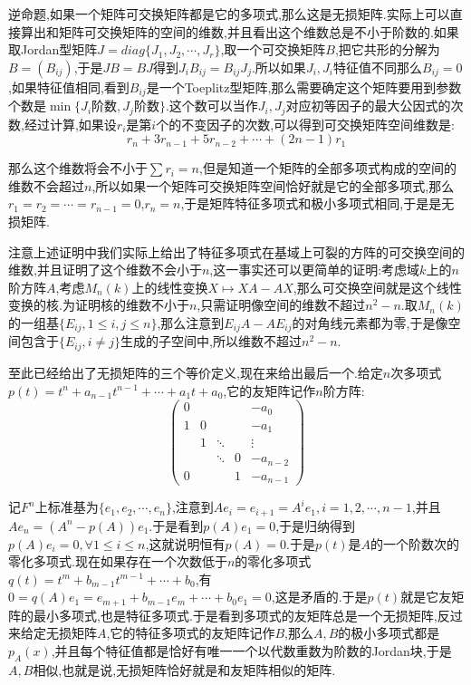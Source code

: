 逆命题,如果一个矩阵可交换矩阵都是它的多项式,那么这是无损矩阵.实际上可以直接算出和矩阵可交换矩阵的空间的维数,并且看出这个维数总是不小于阶数的.如果取Jordan型矩阵$J=diag\{J_1,J_2,\cdots,J_r\}$,取一个可交换矩阵$B$,把它共形的分解为$B=(B_{ij})$,于是$JB=BJ$得到$J_iB_{ij}=B_{ij}J_j$.所以如果$J_i,J_i$特征值不同那么$B_{ij}=0$,如果特征值相同,看到$B_{ij}$是一个Toeplitz型矩阵,那么需要确定这个矩阵要用到参数个数是$\min\{J_i\text{阶数},J_j\text{阶数}\}$.这个数可以当作$J_i,J_j$对应初等因子的最大公因式的次数,经过计算,如果设$r_i$是第$i$个的不变因子的次数,可以得到可交换矩阵空间维数是:
$$r_n+3r_{n-1}+5r_{n-2}+\cdots+(2n-1)r_1$$

那么这个维数将会不小于$\sum r_i=n$,但是知道一个矩阵的全部多项式构成的空间的维数不会超过$n$,所以如果一个矩阵可交换矩阵空间恰好就是它的全部多项式,那么$r_1=r_2=\cdots=r_{n-1}=0$,$r_n=n$,于是矩阵特征多项式和极小多项式相同,于是是无损矩阵.

注意上述证明中我们实际上给出了特征多项式在基域上可裂的方阵的可交换空间的维数,并且证明了这个维数不会小于$n$,这一事实还可以更简单的证明:考虑域$k$上的$n$阶方阵$A$,考虑$M_n(k)$上的线性变换$X\mapsto XA-AX$,那么可交换空间就是这个线性变换的核.为证明核的维数不小于$n$,只需证明像空间的维数不超过$n^2-n$.取$M_{n}(k)$的一组基$\{E_{ij},1\le i,j\le n\}$,那么注意到$E_{ij}A-AE_{ij}$的对角线元素都为零,于是像空间包含于$\{E_{ij},i\not=j\}$生成的子空间中,所以维数不超过$n^2-n$.

至此已经给出了无损矩阵的三个等价定义,现在来给出最后一个.给定$n$次多项式$p(t)=t^n+a_{n-1}t^{n-1}+\cdots+a_1t+a_0$,它的友矩阵记作$n$阶方阵:
$$\left(\begin{array}{ccccc}
0&&&&-a_0\\
1&0&&&-a_1\\
&1&\ddots&&\vdots\\
&&\ddots&0&-a_{n-2}\\
0&&&1&-a_{n-1}\end{array}\right)$$

记$F^n$上标准基为$\{e_1,e_2,\cdots,e_n\}$,注意到$Ae_i=e_{i+1}=A^ie_1,i=1,2,\cdots,n-1$,并且$Ae_n=(A^n-p(A))e_1$.于是看到$p(A)e_1=0$,于是归纳得到$p(A)e_i=0,\forall 1\le i\le n$,这就说明恒有$p(A)=0$.于是$p(t)$是$A$的一个阶数次的零化多项式.现在如果存在一个次数低于$n$的零化多项式$q(t)=t^m+b_ {m-1}t^{m-1}+\cdots+b_0$,有$0=q(A)e_1=e_{m+1}+b_{m-1}e_m+\cdots+b_0e_1=0$,这是矛盾的.于是$p(t)$就是它友矩阵的最小多项式,也是特征多项式.于是看到多项式的友矩阵总是一个无损矩阵,反过来给定无损矩阵$A$,它的特征多项式的友矩阵记作$B$,那么$A,B$的极小多项式都是$p_A(x)$,并且每个特征值都是恰好有唯一一个以代数重数为阶数的Jordan块,于是$A,B$相似,也就是说,无损矩阵恰好就是和友矩阵相似的矩阵.

